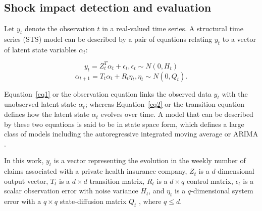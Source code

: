 \documentclass[]{risa}
\begin{document}
\subsection{Shock impact detection and evaluation}\label{methodsBSTS}
Let $y_t$ denote the observation $t$ in a real-valued time series. A structural time series (STS) model can be described by a pair of equations relating $y_t$ to a vector of latent state variables $\alpha_t$:

\begin{equation}\label{eq1}
y_t = Z_t^T \alpha_t + \epsilon_t, \epsilon_t \sim N(0, H_t)
\end{equation}
\begin{equation}\label{eq2}
\alpha_{t+1} = T_t \alpha_t + R_t \eta_t, \eta_t \sim N(0, Q_t).
\end{equation}

Equation~\ref{eq1} or the observation equation links the observed data $y_t$ with the unobserved latent state $\alpha_t$; whereas Equation~\ref{eq2} or the transition equation defines how the latent state $\alpha_t$ evolves over time. A model that can be described by these two equations is said to be in state space form, which defines a large class of models including the autoregressive integrated moving average or ARIMA \cite{scott_predicting_nodate}. 

In this work, $y_t$ is a vector representing the evolution in the weekly number of claims associated with a private health insurance company, $Z_t$ is a $d$-dimensional output vector, $T_t$ is a $d \times d$ transition matrix, $R_t$ is a $d \times q$ control matrix, $\epsilon_t$ is a scalar observation error with noise variance $H_t$, and $\eta_t$ is a $q$-dimensional system error with a $q \times q$ state-diffusion matrix $Q_t$ , where $q \leq d$. 
\end{document}
